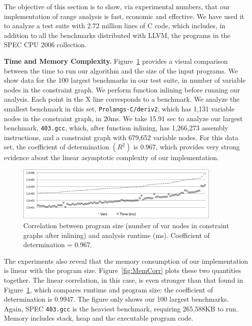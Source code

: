 \documentclass[preprint]{elsarticle}
\begin{document}
The objective of this section is to show, via experimental numbers, that our
implementation of range analysis is fast, economic and effective.
We have used it to analyze a test suite with 2.72 million lines of C code,
which includes, in addition to all the benchmarks distributed with LLVM,
the programs in the SPEC CPU 2006 collection.

\noindent
\textbf{Time and Memory Complexity.}
Figure~\ref{fig:TimeCorr} provides a visual comparison between the time to
run our algorithm and the size of the input programs.
We show data for the 100 largest benchmarks in our test suite, in number
of variable nodes in the constraint graph.
We perform function inlining before running our analysis.
Each point in the X line corresponds to a benchmark.
We analyze the smallest benchmark in this set, \texttt{Prolangs-C/deriv2}, which
has 1,131 variable nodes in the constraint graph, in 20ms.
We take 15.91 sec to analyze our largest benchmark, \texttt{403.gcc}, which,
after function inlining, has 1,266,273 assembly instructions, and a
constraint graph with 679,652 variable nodes.
For this data set, the coefficient of determination $(R^2)$ is 0.967, which
provides very strong evidence about the linear asymptotic complexity of our
implementation.

\begin{figure}[t!]
\begin{center}
\includegraphics[width=0.9\textwidth]{images/TimeCorr}
\end{center}
\caption{\label{fig:TimeCorr}
Correlation between program size (number of var nodes in constraint
graphs after inlining) and analysis runtime (ms).
Coefficient of determination = 0.967.
}
\end{figure}

The experiments also reveal that the memory consumption of our implementation
is linear with the program size.
Figure~\ref{fig:MemCorr} plots these two quantities together.
The linear correlation, in this case, is even stronger than that found in
Figure~\ref{fig:TimeCorr}, which compares runtime and program size: the
coefficient of determination is 0.9947.
The figure only shows our 100 largest benchmarks.
Again, SPEC \texttt{403.gcc} is the heaviest benchmark, requiring
265,588KB to run.
Memory includes stack, heap and the executable program code.
\end{document}
